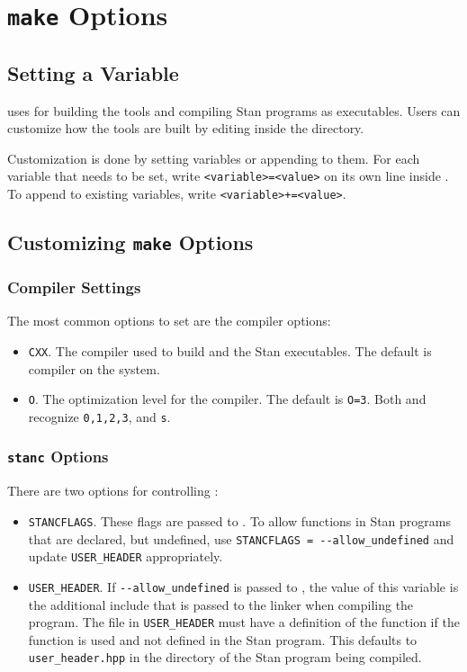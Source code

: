 \section{{\tt make} Options}\label{make-options.appendix}

\subsection{Setting a Variable}
\CmdStan uses  for building the \CmdStan tools and
compiling Stan programs as executables. Users can customize how the
tools are built by editing  inside the
 directory.

Customization is done by setting variables or appending to them. For
each variable that needs to be set, write \Verb|<variable>=<value>| on
its own line inside . To append to existing
variables, write \Verb|<variable>+=<value>|.

\subsection{Customizing {\tt make} Options}

\subsubsection{Compiler Settings}

The most common options to set are the compiler options:
%
\begin{itemize}
  \item \Verb|CXX|. The compiler used to build \CmdStan and the Stan
    executables. The default is \Cpp compiler on the system.
  \item \Verb|O|. The optimization level for the compiler. The default
    is \Verb|O=3|. Both \gpp and \clang recognize \Verb|0,1,2,3|, and
    \Verb|s|.
\end{itemize}

\subsubsection{{\tt stanc} Options}

There are two options for controlling \stanc:
%
\begin{itemize}
\item \Verb|STANCFLAGS|. These flags are passed to \stanc.  To allow
  functions in Stan programs that are declared, but undefined, use
  \Verb|STANCFLAGS = --allow_undefined| and update \Verb|USER_HEADER|
  appropriately.
\item \Verb|USER_HEADER|. If \Verb|--allow_undefined| is passed to
  \stanc, the value of this variable is the additional include that is
  passed to the \Cpp linker when compiling the program. The file in
  \Verb|USER_HEADER| must have a definition of the function if the function
  is used and not defined in the Stan program. This defaults to
  \Verb|user_header.hpp| in the directory of the Stan program being compiled.
\end{itemize}
%

